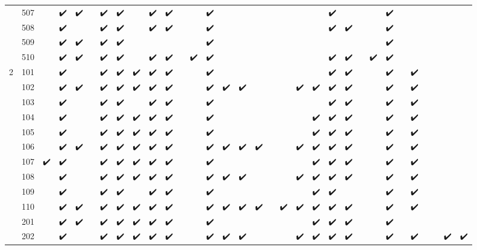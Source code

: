 \begin{tabular}{llcccccccccccccccccccccccccccccc}
 & 507 &  & ✔️ & ✔️ &  & ✔️ & ✔️ &  & ✔️ & ✔️ &  &  & ✔️ &  &  &  &  &  &  &  & ✔️ &  &  &  & ✔️ &  &  &  &  &  &  \\
 & 508 &  & ✔️ &  &  & ✔️ & ✔️ &  & ✔️ & ✔️ &  &  & ✔️ &  &  &  &  &  &  &  & ✔️ & ✔️ &  &  & ✔️ &  &  &  &  &  &  \\
 & 509 &  & ✔️ & ✔️ &  & ✔️ & ✔️ &  &  &  &  &  & ✔️ &  &  &  &  &  &  &  &  &  &  &  & ✔️ &  &  &  &  &  &  \\
 & 510 &  & ✔️ & ✔️ &  & ✔️ & ✔️ &  & ✔️ & ✔️ &  & ✔️ & ✔️ &  &  &  &  &  &  &  & ✔️ & ✔️ &  & ✔️ & ✔️ &  &  &  &  &  &  \\
\cline{1-32}
\multirow[t]{52}{*}{2} & 101 &  & ✔️ &  &  & ✔️ & ✔️ & ✔️ & ✔️ & ✔️ &  &  & ✔️ &  &  &  &  &  &  &  & ✔️ & ✔️ &  &  & ✔️ &  & ✔️ &  &  &  &  \\
 & 102 &  & ✔️ & ✔️ &  & ✔️ & ✔️ & ✔️ & ✔️ & ✔️ &  &  & ✔️ & ✔️ & ✔️ &  &  &  & ✔️ & ✔️ & ✔️ & ✔️ &  &  & ✔️ &  & ✔️ &  &  &  &  \\
 & 103 &  & ✔️ &  &  & ✔️ & ✔️ &  & ✔️ & ✔️ &  &  & ✔️ &  &  &  &  &  &  &  & ✔️ & ✔️ &  &  & ✔️ &  & ✔️ &  &  &  &  \\
 & 104 &  & ✔️ &  &  & ✔️ & ✔️ & ✔️ & ✔️ & ✔️ &  &  & ✔️ &  &  &  &  &  &  & ✔️ & ✔️ & ✔️ &  &  & ✔️ &  & ✔️ &  &  &  &  \\
 & 105 &  & ✔️ &  &  & ✔️ & ✔️ & ✔️ & ✔️ & ✔️ &  &  & ✔️ &  &  &  &  &  &  & ✔️ & ✔️ & ✔️ &  &  & ✔️ &  & ✔️ &  &  &  &  \\
 & 106 &  & ✔️ & ✔️ &  & ✔️ & ✔️ & ✔️ & ✔️ & ✔️ &  &  & ✔️ & ✔️ & ✔️ & ✔️ &  &  & ✔️ & ✔️ & ✔️ & ✔️ &  &  & ✔️ &  & ✔️ &  &  &  &  \\
 & 107 & ✔️ & ✔️ &  &  & ✔️ & ✔️ & ✔️ & ✔️ & ✔️ &  &  & ✔️ &  &  &  &  &  &  & ✔️ & ✔️ & ✔️ &  &  & ✔️ &  & ✔️ &  &  &  &  \\
 & 108 &  & ✔️ &  &  & ✔️ & ✔️ & ✔️ & ✔️ & ✔️ &  &  & ✔️ & ✔️ & ✔️ &  &  &  & ✔️ & ✔️ & ✔️ & ✔️ &  &  & ✔️ &  & ✔️ &  &  &  &  \\
 & 109 &  & ✔️ &  &  & ✔️ & ✔️ &  & ✔️ & ✔️ &  &  & ✔️ &  &  &  &  &  &  & ✔️ & ✔️ &  &  &  & ✔️ &  & ✔️ &  &  &  &  \\
 & 110 &  & ✔️ & ✔️ &  & ✔️ & ✔️ & ✔️ & ✔️ & ✔️ &  &  & ✔️ & ✔️ & ✔️ & ✔️ &  & ✔️ & ✔️ & ✔️ & ✔️ & ✔️ &  &  & ✔️ &  & ✔️ &  &  &  &  \\
 & 201 &  & ✔️ & ✔️ &  & ✔️ & ✔️ & ✔️ & ✔️ & ✔️ &  &  & ✔️ &  &  &  &  &  &  & ✔️ & ✔️ & ✔️ &  &  & ✔️ &  &  &  &  &  &  \\
 & 202 &  & ✔️ &  &  & ✔️ & ✔️ & ✔️ & ✔️ & ✔️ &  &  & ✔️ & ✔️ & ✔️ &  &  &  & ✔️ & ✔️ & ✔️ & ✔️ &  &  & ✔️ &  & ✔️ &  &  & ✔️ & ✔️ \\

\end{tabular}
